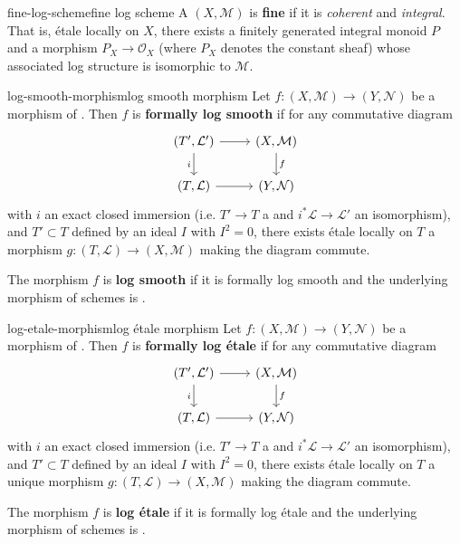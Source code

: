 \begin{topic}{fine-log-scheme}{fine log scheme}
    A  $(X, \mathcal{M})$ is \textbf{fine} if it is \textit{coherent} and \textit{integral}. That is, étale locally on $X$, there exists a finitely generated integral monoid $P$ and a morphism $P_X \to \mathcal{O}_X$ (where $P_X$ denotes the constant sheaf) whose associated log structure is isomorphic to $\mathcal{M}$.
\end{topic}

\begin{topic}{log-smooth-morphism}{log smooth morphism}
    Let $f : (X, \mathcal{M}) \to (Y, \mathcal{N})$ be a morphism of  . Then $f$ is \textbf{formally log smooth} if for any commutative diagram
    \[ \begin{tikzcd} (T', \mathcal{L}') \arrow{r} \arrow[swap]{d}{i} & (X, \mathcal{M}) \arrow{d}{f} \\ (T, \mathcal{L}) \arrow{r} & (Y, \mathcal{N}) \end{tikzcd} \]
    with $i$ an exact closed immersion (i.e. $T' \to T$ a  and $i^* \mathcal{L} \to \mathcal{L}'$ an isomorphism), and $T' \subset T$ defined by an ideal $I$ with $I^2 = 0$, there exists étale locally on $T$ a morphism $g : (T, \mathcal{L}) \to (X, \mathcal{M})$ making the diagram commute.
    
    The morphism $f$ is \textbf{log smooth} if it is formally log smooth and the underlying morphism of schemes is .
\end{topic}

\begin{topic}{log-etale-morphism}{log étale morphism}
    Let $f : (X, \mathcal{M}) \to (Y, \mathcal{N})$ be a morphism of  . Then $f$ is \textbf{formally log étale} if for any commutative diagram
    \[ \begin{tikzcd} (T', \mathcal{L}') \arrow{r} \arrow[swap]{d}{i} & (X, \mathcal{M}) \arrow{d}{f} \\ (T, \mathcal{L}) \arrow{r} & (Y, \mathcal{N}) \end{tikzcd} \]
    with $i$ an exact closed immersion (i.e. $T' \to T$ a  and $i^* \mathcal{L} \to \mathcal{L}'$ an isomorphism), and $T' \subset T$ defined by an ideal $I$ with $I^2 = 0$, there exists étale locally on $T$ a unique morphism $g : (T, \mathcal{L}) \to (X, \mathcal{M})$ making the diagram commute.
    
    The morphism $f$ is \textbf{log étale} if it is formally log étale and the underlying morphism of schemes is .
\end{topic}

